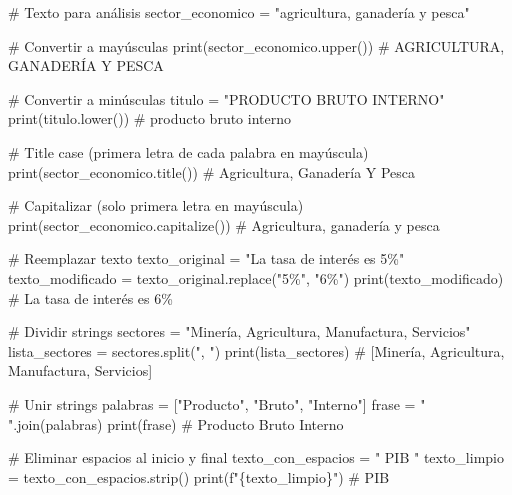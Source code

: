 \documentclass[
  doc,
  floatsintext,
  longtable,
  a4paper,
  nolmodern,
  notxfonts,
  notimes,
  12pt,
  colorlinks=true,linkcolor=blue,citecolor=blue,urlcolor=blue]{apa7}
\newenvironment{Shaded}{\begin{snugshade}}{\end{snugshade}}
\newcommand{\BuiltInTok}[1]{\textcolor[rgb]{0.00,0.23,0.31}{#1}}
\newcommand{\CommentTok}[1]{\textcolor[rgb]{0.37,0.37,0.37}{#1}}
\newcommand{\NormalTok}[1]{\textcolor[rgb]{0.00,0.23,0.31}{#1}}
\newcommand{\OperatorTok}[1]{\textcolor[rgb]{0.37,0.37,0.37}{#1}}
\newcommand{\SpecialCharTok}[1]{\textcolor[rgb]{0.37,0.37,0.37}{#1}}
\newcommand{\SpecialStringTok}[1]{\textcolor[rgb]{0.13,0.47,0.30}{#1}}
\newcommand{\StringTok}[1]{\textcolor[rgb]{0.13,0.47,0.30}{#1}}
\begin{document}
\begin{Shaded}
\begin{Highlighting}[]
\CommentTok{\# Texto para análisis}
\NormalTok{sector\_economico }\OperatorTok{=} \StringTok{"agricultura, ganadería y pesca"}

\CommentTok{\# Convertir a mayúsculas}
\BuiltInTok{print}\NormalTok{(sector\_economico.upper())  }\CommentTok{\# AGRICULTURA, GANADERÍA Y PESCA}

\CommentTok{\# Convertir a minúsculas}
\NormalTok{titulo }\OperatorTok{=} \StringTok{"PRODUCTO BRUTO INTERNO"}
\BuiltInTok{print}\NormalTok{(titulo.lower())  }\CommentTok{\# producto bruto interno}

\CommentTok{\# Title case (primera letra de cada palabra en mayúscula)}
\BuiltInTok{print}\NormalTok{(sector\_economico.title())  }\CommentTok{\# Agricultura, Ganadería Y Pesca}

\CommentTok{\# Capitalizar (solo primera letra en mayúscula)}
\BuiltInTok{print}\NormalTok{(sector\_economico.capitalize())  }\CommentTok{\# Agricultura, ganadería y pesca}

\CommentTok{\# Reemplazar texto}
\NormalTok{texto\_original }\OperatorTok{=} \StringTok{"La tasa de interés es 5\%"}
\NormalTok{texto\_modificado }\OperatorTok{=}\NormalTok{ texto\_original.replace(}\StringTok{"5\%"}\NormalTok{, }\StringTok{"6\%"}\NormalTok{)}
\BuiltInTok{print}\NormalTok{(texto\_modificado)  }\CommentTok{\# La tasa de interés es 6\%}

\CommentTok{\# Dividir strings}
\NormalTok{sectores }\OperatorTok{=} \StringTok{"Minería, Agricultura, Manufactura, Servicios"}
\NormalTok{lista\_sectores }\OperatorTok{=}\NormalTok{ sectores.split(}\StringTok{", "}\NormalTok{)}
\BuiltInTok{print}\NormalTok{(lista\_sectores)  }\CommentTok{\# [\textquotesingle{}Minería\textquotesingle{}, \textquotesingle{}Agricultura\textquotesingle{}, \textquotesingle{}Manufactura\textquotesingle{}, \textquotesingle{}Servicios\textquotesingle{}]}

\CommentTok{\# Unir strings}
\NormalTok{palabras }\OperatorTok{=}\NormalTok{ [}\StringTok{"Producto"}\NormalTok{, }\StringTok{"Bruto"}\NormalTok{, }\StringTok{"Interno"}\NormalTok{]}
\NormalTok{frase }\OperatorTok{=} \StringTok{" "}\NormalTok{.join(palabras)}
\BuiltInTok{print}\NormalTok{(frase)  }\CommentTok{\# Producto Bruto Interno}

\CommentTok{\# Eliminar espacios al inicio y final}
\NormalTok{texto\_con\_espacios }\OperatorTok{=} \StringTok{"   PIB   "}
\NormalTok{texto\_limpio }\OperatorTok{=}\NormalTok{ texto\_con\_espacios.strip()}
\BuiltInTok{print}\NormalTok{(}\SpecialStringTok{f"\textquotesingle{}}\SpecialCharTok{\{}\NormalTok{texto\_limpio}\SpecialCharTok{\}}\SpecialStringTok{\textquotesingle{}"}\NormalTok{)  }\CommentTok{\# \textquotesingle{}PIB\textquotesingle{}}
\end{Highlighting}
\end{Shaded}
\end{document}

